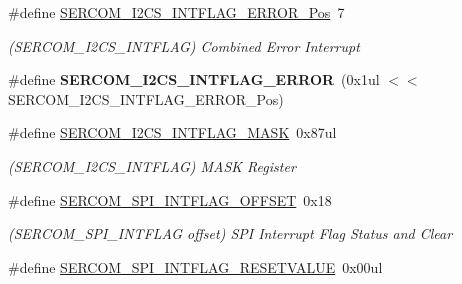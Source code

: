 \begin{DoxyCompactItemize}
\item 
\hypertarget{group___s_a_m_l21___s_e_r_c_o_m_ga283186c68358fd5c9c5fedd7d09456a5}{}\#define \hyperlink{group___s_a_m_l21___s_e_r_c_o_m_ga283186c68358fd5c9c5fedd7d09456a5}{S\+E\+R\+C\+O\+M\+\_\+\+I2\+C\+S\+\_\+\+I\+N\+T\+F\+L\+A\+G\+\_\+\+E\+R\+R\+O\+R\+\_\+\+Pos}~7\label{group___s_a_m_l21___s_e_r_c_o_m_ga283186c68358fd5c9c5fedd7d09456a5}

\begin{DoxyCompactList}\small\item\em (S\+E\+R\+C\+O\+M\+\_\+\+I2\+C\+S\+\_\+\+I\+N\+T\+F\+L\+A\+G) Combined Error Interrupt \end{DoxyCompactList}\item 
\hypertarget{group___s_a_m_l21___s_e_r_c_o_m_gade51d595b2e5da8425f67c1679cc24a0}{}\#define {\bfseries S\+E\+R\+C\+O\+M\+\_\+\+I2\+C\+S\+\_\+\+I\+N\+T\+F\+L\+A\+G\+\_\+\+E\+R\+R\+O\+R}~(0x1ul $<$$<$ S\+E\+R\+C\+O\+M\+\_\+\+I2\+C\+S\+\_\+\+I\+N\+T\+F\+L\+A\+G\+\_\+\+E\+R\+R\+O\+R\+\_\+\+Pos)\label{group___s_a_m_l21___s_e_r_c_o_m_gade51d595b2e5da8425f67c1679cc24a0}

\item 
\hypertarget{group___s_a_m_l21___s_e_r_c_o_m_ga8e225e237334deb769931e8f129e61fa}{}\#define \hyperlink{group___s_a_m_l21___s_e_r_c_o_m_ga8e225e237334deb769931e8f129e61fa}{S\+E\+R\+C\+O\+M\+\_\+\+I2\+C\+S\+\_\+\+I\+N\+T\+F\+L\+A\+G\+\_\+\+M\+A\+S\+K}~0x87ul\label{group___s_a_m_l21___s_e_r_c_o_m_ga8e225e237334deb769931e8f129e61fa}

\begin{DoxyCompactList}\small\item\em (S\+E\+R\+C\+O\+M\+\_\+\+I2\+C\+S\+\_\+\+I\+N\+T\+F\+L\+A\+G) M\+A\+S\+K Register \end{DoxyCompactList}\item 
\hypertarget{group___s_a_m_l21___s_e_r_c_o_m_ga9a541e90f6a7b20fefab55898955cf57}{}\#define \hyperlink{group___s_a_m_l21___s_e_r_c_o_m_ga9a541e90f6a7b20fefab55898955cf57}{S\+E\+R\+C\+O\+M\+\_\+\+S\+P\+I\+\_\+\+I\+N\+T\+F\+L\+A\+G\+\_\+\+O\+F\+F\+S\+E\+T}~0x18\label{group___s_a_m_l21___s_e_r_c_o_m_ga9a541e90f6a7b20fefab55898955cf57}

\begin{DoxyCompactList}\small\item\em (S\+E\+R\+C\+O\+M\+\_\+\+S\+P\+I\+\_\+\+I\+N\+T\+F\+L\+A\+G offset) S\+P\+I Interrupt Flag Status and Clear \end{DoxyCompactList}\item 
\hypertarget{group___s_a_m_l21___s_e_r_c_o_m_ga0150d7d64d32850c8f1854fe9c2ae949}{}\#define \hyperlink{group___s_a_m_l21___s_e_r_c_o_m_ga0150d7d64d32850c8f1854fe9c2ae949}{S\+E\+R\+C\+O\+M\+\_\+\+S\+P\+I\+\_\+\+I\+N\+T\+F\+L\+A\+G\+\_\+\+R\+E\+S\+E\+T\+V\+A\+L\+U\+E}~0x00ul\label{group___s_a_m_l21___s_e_r_c_o_m_ga0150d7d64d32850c8f1854fe9c2ae949}


\end{DoxyCompactItemize}
